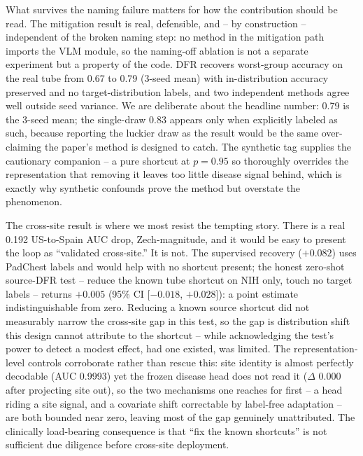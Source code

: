 \documentclass{ieeeaccess}
\begin{document}
What survives the naming failure matters for how the contribution should be
read. The mitigation result is real, defensible, and -- by construction --
independent of the broken naming step: no method in the mitigation path
imports the VLM module, so the naming-off ablation is not a separate
experiment but a property of the code. DFR recovers worst-group accuracy on
the real tube from 0.67 to 0.79 (3-seed mean) with in-distribution accuracy
preserved and no target-distribution labels, and two independent methods
agree well outside seed variance. We are deliberate about the headline
number: 0.79 is the 3-seed mean; the single-draw 0.83 appears only when
explicitly labeled as such, because reporting the luckier draw as the result
would be the same over-claiming the paper's method is designed to catch. The
synthetic tag supplies the cautionary companion -- a pure shortcut at
$p=0.95$ so thoroughly overrides the representation that removing it leaves
too little disease signal behind, which is exactly why synthetic confounds
prove the method but overstate the phenomenon.

The cross-site result is where we most resist the tempting story. There is
a real 0.192 US-to-Spain AUC drop, Zech-magnitude, and it would be easy to
present the loop as ``validated cross-site.'' It is not. The supervised
recovery ($+0.082$) uses PadChest labels and would help with no shortcut
present; the honest zero-shot source-DFR test -- reduce the known tube
shortcut on NIH only, touch no target labels -- returns $+0.005$ (95\% CI
[$-0.018$, $+0.028$]): a point estimate indistinguishable from zero. Reducing
a known source shortcut did not measurably narrow the cross-site gap in this
test, so the gap is distribution shift this design cannot attribute to the
shortcut -- while acknowledging the test's power to detect a modest effect,
had one existed, was limited. The representation-level controls corroborate
rather than rescue this: site identity is almost perfectly decodable (AUC
0.9993) yet the frozen disease head does not read it ($\Delta$ 0.000 after
projecting site out), so the two mechanisms one reaches for first -- a head
riding a site signal, and a covariate shift correctable by label-free
adaptation -- are both bounded near zero, leaving most of the gap genuinely
unattributed. The clinically load-bearing consequence is that ``fix the
known shortcuts'' is not sufficient due diligence before cross-site
deployment.
\end{document}
